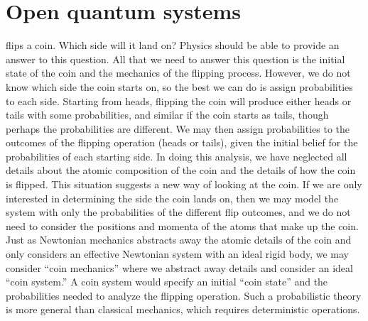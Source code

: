 \documentclass[../thesis.tex]{subfiles}
\begin{document}
\chapter{Open quantum systems}\label{ch:open-quantum-systems}

 flips a coin. Which side will it land on? Physics should be
able to provide an answer to this question. All that we need to answer this
question is the initial state of the coin and the mechanics of the flipping
process. However, we do not know which side the coin starts on, so the best we
can do is assign probabilities to each side. Starting from heads, flipping the
coin will produce either heads or tails with some probabilities, and similar if
the coin starts as tails, though perhaps the probabilities are different. We may
then assign probabilities to the outcomes of the flipping operation (heads or
tails), given the initial belief for the probabilities of each starting side. In
doing this analysis, we have neglected all details about the atomic composition
of the coin and the details of how the coin is flipped. This situation suggests
a new way of looking at the coin. If we are only interested in determining the
side the coin lands on, then we may model the system with only the probabilities
of the different flip outcomes, and we do not need to consider the positions and
momenta of the atoms that make up the coin. Just as Newtonian mechanics
abstracts away the atomic details of the coin and only considers an effective
Newtonian system with an ideal rigid body, we may consider ``coin mechanics''
where we abstract away details and consider an ideal ``coin system.'' A coin
system would specify an initial ``coin state'' and the probabilities needed to
analyze the flipping operation. Such a probabilistic theory is more general than
classical mechanics, which requires deterministic operations.
\end{document}
